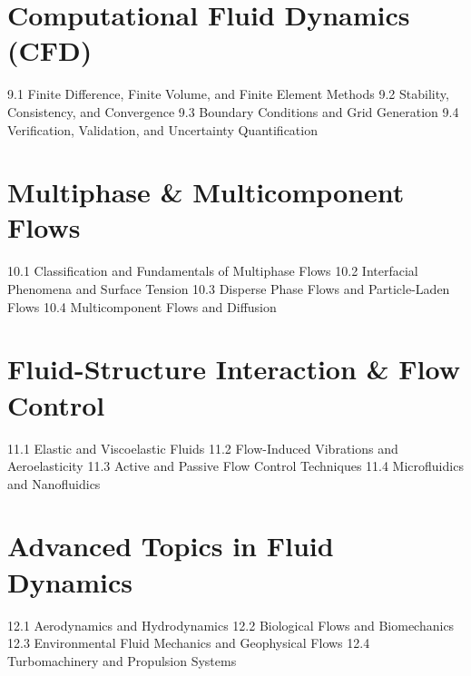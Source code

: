 \section{Computational Fluid Dynamics (CFD)}
9.1 Finite Difference, Finite Volume, and Finite Element Methods
9.2 Stability, Consistency, and Convergence
9.3 Boundary Conditions and Grid Generation
9.4 Verification, Validation, and Uncertainty Quantification
\section{Multiphase \& Multicomponent Flows}
10.1 Classification and Fundamentals of Multiphase Flows
10.2 Interfacial Phenomena and Surface Tension
10.3 Disperse Phase Flows and Particle-Laden Flows
10.4 Multicomponent Flows and Diffusion
\section{Fluid-Structure Interaction \& Flow Control}
11.1 Elastic and Viscoelastic Fluids
11.2 Flow-Induced Vibrations and Aeroelasticity
11.3 Active and Passive Flow Control Techniques
11.4 Microfluidics and Nanofluidics
\section{Advanced Topics in Fluid Dynamics}
12.1 Aerodynamics and Hydrodynamics
12.2 Biological Flows and Biomechanics
12.3 Environmental Fluid Mechanics and Geophysical Flows
12.4 Turbomachinery and Propulsion Systems
